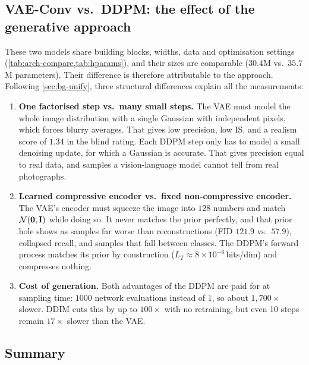 \subsection{VAE-Conv vs.\ DDPM: the effect of the generative approach}
These two models share building blocks, widths, data and optimisation settings (\cref{tab:arch-compare,tab:hparams}),
and their sizes are comparable ($30.4$M vs.\ $35.7$M parameters). Their difference is therefore attributable to
the approach. Following \cref{sec:bg-unify}, three structural differences explain all the measurements:
\begin{enumerate}
  \item \textbf{One factorised step vs.\ many small steps.} The VAE must model the whole image distribution with a
        single Gaussian with independent pixels, which forces blurry averages. That gives low precision, low IS,
        and a realism score of $1.34$ in the blind rating. Each DDPM step only has to model a small denoising
        update, for which a Gaussian is accurate. That gives precision equal to real data, and samples a
        vision-language model cannot tell from real photographs.
  \item \textbf{Learned compressive encoder vs.\ fixed non-compressive encoder.} The VAE's encoder must squeeze the
        image into $128$ numbers and match $\mathcal{N}(\mathbf{0},\mathbf{I})$ while doing so. It never matches the prior perfectly,
        and that prior hole shows as samples far worse than reconstructions (FID $121.9$ vs.\ $57.9$), collapsed
        recall, and samples that fall between classes. The DDPM's forward process matches its prior by
        construction ($L_T\approx8\times10^{-6}$\,bits/dim) and compresses nothing.
  \item \textbf{Cost of generation.} Both advantages of the DDPM are paid for at sampling time: $1000$ network
        evaluations instead of $1$, so about $1{,}700\times$ slower. DDIM cuts this by up to $100\times$ with no
        retraining, but even 10 steps remain $17\times$ slower than the VAE.
\end{enumerate}

\subsection{Summary}

